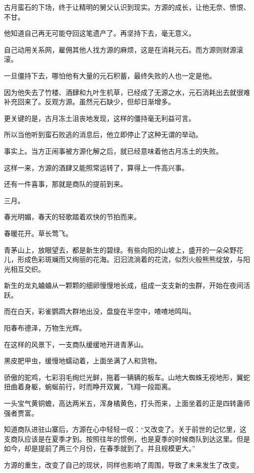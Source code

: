 \begin{this_body}
古月蛮石的下场，终于让精明的舅父认识到现实。方源的成长，让他无奈、愤恨、不甘。

他知道自己再无可能夺回这笔遗产了。再坚持下去，毫无意义。

自己动用关系网，雇佣其他人找方源的麻烦，这是在消耗元石。而方源则财源滚滚。

一旦僵持下去，哪怕他有大量的元石积蓄，最终失败的人也一定是他。

因为他失去了竹楼、酒肆和九叶生机草，已经成了无源之水，元石消耗出去就很难补充回来了。反观方源。虽然元石缺少，但却日渐增多。

更关键的是，古月冻土沮丧地发现，这样的僵持毫无利益可言。

所以当他听到蛮石败逃的消息后，他立即停止了这种无谓的举动。

事实上。当方正闹事被方源化解之后，就已经意味着他古月冻土的失败。

这样一来，方源的酒肆又能照常运转了，算得上一件高兴事。

还有一件喜事，那就是商队的提前到来。

三月。

春光明媚，春天的轻歌踏着欢快的节拍而来。

春暖花开。草长莺飞。

青茅山上，放眼望去，都是新生的碧绿。有些向阳的山坡上，盛开的一朵朵野花儿，形成色彩斑斓而又绚丽的花海。汩汩流淌着的花流，似烈火般熊熊绽放，与阳光相互交织。

新生的龙丸蛐蛐从一颗颗的细卵慢慢地长成，组成一支支新的虫群，开始在夜间活跃。

而在白天，彩雀鹦鹉大群地出没，盘旋在半空中，喳喳地鸣叫。

阳春布德泽，万物生光辉。

在这样的风景下，一支商队缓缓地开进青茅山。

黑皮肥甲虫，缓慢地蠕动着，上面坐满了人和货物。

骄傲的驼鸡，七彩羽毛绚烂光鲜，拖着一辆辆的板车。山地大蜘蛛无视地形，翼蛇扭曲着身躯，蜿蜒前行，时而睁开双翼，飞翔一段距离。

一头宝气黄铜蟾，高达两米五，浑身橘黄色，打头而来，上面坐着的正是四转蛊师强者贾富。

知道商队进驻山寨后，方源在心中轻轻一叹：“又改变了。关于前世的记忆里，这支商队应该是在夏季才到。按照往年的惯例，也是夏季的时候商队到达这里。但是如今，却是提前了两三个月份，在春季就到了。并且规模更大。”

方源的重生，改变了自己的现状，同样也影响了周围，导致了未来发生了改变。


\end{this_body}
